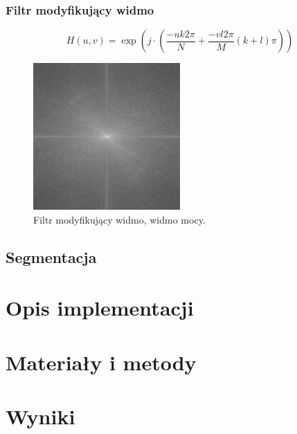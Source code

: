 \documentclass{classrep}
\begin{document}
\subsubsection{Filtr modyfikujący widmo}

\begin{equation}
\label{eq:modyfikacja}
H(u,v) = \exp { \left( j \cdot \left( \frac{-u k 2 \pi}{N} + \frac{-v l 2 \pi }{M} \left( k + l  \right) \pi \right)\right) }
\end{equation}

\begin{figure}[H]
  \centering
  \includegraphics[width=0.5\textwidth]{img/lena_spectreMod}
  \caption{Filtr modyfikujący widmo, widmo mocy.}
  \label{fig_widmo_lena_spectreMod}
\end{figure}


\subsection{Segmentacja}





\section{Opis implementacji}



\section{Materiały i metody}



\section{Wyniki}
\end{document}
